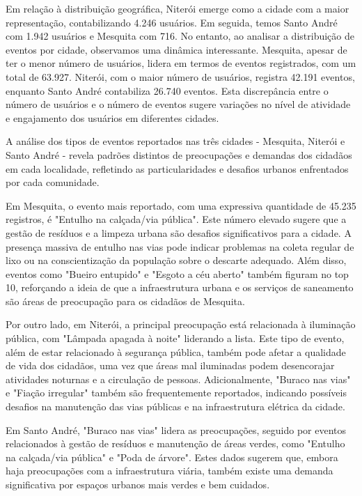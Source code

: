 Em relação à distribuição geográfica, Niterói emerge como a cidade com a maior representação, contabilizando 4.246 usuários. Em seguida, temos Santo André com 1.942 usuários e Mesquita com 716. No entanto, ao analisar a distribuição de eventos por cidade, observamos uma dinâmica interessante. Mesquita, apesar de ter o menor número de usuários, lidera em termos de eventos registrados, com um total de 63.927. Niterói, com o maior número de usuários, registra 42.191 eventos, enquanto Santo André contabiliza 26.740 eventos. Esta discrepância entre o número de usuários e o número de eventos sugere variações no nível de atividade e engajamento dos usuários em diferentes cidades.

A análise dos tipos de eventos reportados nas três cidades - Mesquita, Niterói e Santo André - revela padrões distintos de preocupações e demandas dos cidadãos em cada localidade, refletindo as particularidades e desafios urbanos enfrentados por cada comunidade.

Em Mesquita, o evento mais reportado, com uma expressiva quantidade de 45.235 registros, é "Entulho na calçada/via pública". Este número elevado sugere que a gestão de resíduos e a limpeza urbana são desafios significativos para a cidade. A presença massiva de entulho nas vias pode indicar problemas na coleta regular de lixo ou na conscientização da população sobre o descarte adequado. Além disso, eventos como "Bueiro entupido" e "Esgoto a céu aberto" também figuram no top 10, reforçando a ideia de que a infraestrutura urbana e os serviços de saneamento são áreas de preocupação para os cidadãos de Mesquita.

Por outro lado, em Niterói, a principal preocupação está relacionada à iluminação pública, com "Lâmpada apagada à noite" liderando a lista. Este tipo de evento, além de estar relacionado à segurança pública, também pode afetar a qualidade de vida dos cidadãos, uma vez que áreas mal iluminadas podem desencorajar atividades noturnas e a circulação de pessoas. Adicionalmente, "Buraco nas vias" e "Fiação irregular" também são frequentemente reportados, indicando possíveis desafios na manutenção das vias públicas e na infraestrutura elétrica da cidade.

Em Santo André, "Buraco nas vias" lidera as preocupações, seguido por eventos relacionados à gestão de resíduos e manutenção de áreas verdes, como "Entulho na calçada/via pública" e "Poda de árvore". Estes dados sugerem que, embora haja preocupações com a infraestrutura viária, também existe uma demanda significativa por espaços urbanos mais verdes e bem cuidados.

